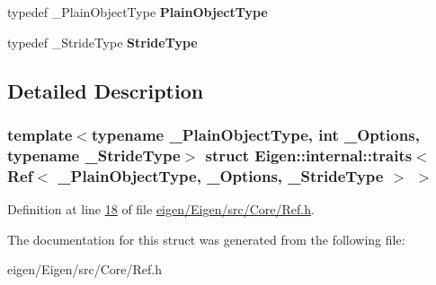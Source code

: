 \begin{DoxyCompactItemize}
typedef \+\_\+\+Plain\+Object\+Type {\bfseries Plain\+Object\+Type}
\item 
\mbox{\label{struct_eigen_1_1internal_1_1traits_3_01_ref_3_01___plain_object_type_00_01___options_00_01___stride_type_01_4_01_4_a3d87abd458a368ce0a3ec13e4c90667a}} 
typedef \+\_\+\+Stride\+Type {\bfseries Stride\+Type}
\end{DoxyCompactItemize}


\subsection{Detailed Description}
\subsubsection*{template$<$typename \+\_\+\+Plain\+Object\+Type, int \+\_\+\+Options, typename \+\_\+\+Stride\+Type$>$\newline
struct Eigen\+::internal\+::traits$<$ Ref$<$ \+\_\+\+Plain\+Object\+Type, \+\_\+\+Options, \+\_\+\+Stride\+Type $>$ $>$}



Definition at line \hyperlink{eigen_2_eigen_2src_2_core_2_ref_8h_source_l00018}{18} of file \hyperlink{eigen_2_eigen_2src_2_core_2_ref_8h_source}{eigen/\+Eigen/src/\+Core/\+Ref.\+h}.



The documentation for this struct was generated from the following file\+:\begin{DoxyCompactItemize}
\item 
eigen/\+Eigen/src/\+Core/\+Ref.\+h\end{DoxyCompactItemize}
